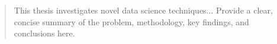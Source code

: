 \documentclass[11pt, letterpaper]{report}
\begin{document}


\setcounter{page}{2}

\begin{abstract}
This thesis investigates novel data science techniques... Provide a clear, concise summary of the problem, methodology, key findings, and conclusions here.
\end{abstract}

\tableofcontents
\listoffigures
\listoftables

\printglossary[type=\acronymtype, title={List of Acronyms}]

\clearpage
{}







\clearpage


\end{document}
